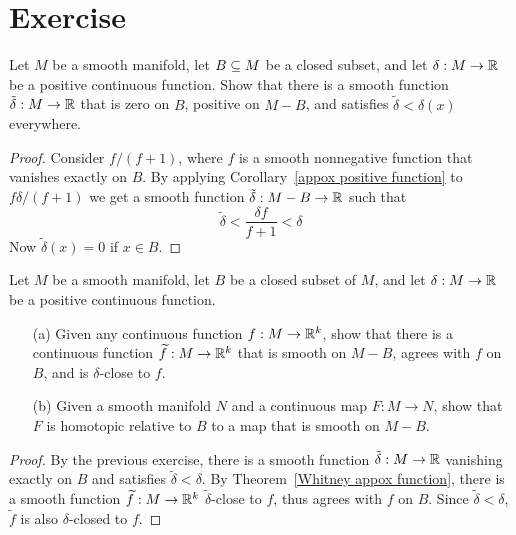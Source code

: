 \section{Exercise}
\begin{exercise}
Let $M$ be a smooth manifold, let $B\subseteq M$ be a closed subset, and let $\delta:M\to\mathbb{R}$ be a positive continuous function. Show that there is a smooth function $\tilde{\delta}:M\to\mathbb{R}$ that is zero on $B$, positive on $M-B$, and satisfies $\tilde{\delta}<\delta(x)$ everywhere.
\end{exercise}
\begin{proof}
Consider $f/(f+1)$, where $f$ is a smooth nonnegative function that vanishes exactly on $B$. By applying Corollary~\ref{appox positive function} to $f\delta/(f+1)$ we get a smooth function $\tilde{\delta}:M-B\to\mathbb{R}$ such that 
\[\tilde{\delta}<\frac{\delta f}{f+1}<\delta\]
Now $\tilde{\delta}(x)=0$ if $x\in B$.
\end{proof}
\begin{exercise}
Let $M$ be a smooth manifold, let $B$ be a closed subset of $M$, and let $\delta:M\to\mathbb{R}$ be a positive continuous function.
\begin{itemize}
\item[(a)]Given any continuous function $f:M\to\mathbb{R}^k$, show that there is a continuous function $\widetilde{f}:M\to\mathbb{R}^k$ that is smooth on $M-B$, agrees with $f$ on $B$, and is $\delta$-close to $f$.
\item[(b)]Given a smooth manifold $N$ and a continuous map $F:M\to N$, show that $F$ is homotopic relative to $B$ to a map that is smooth on $M-B$.
\end{itemize}
\end{exercise}
\begin{proof}
By the previous exercise, there is a smooth function $\tilde{\delta}:M\to\mathbb{R}$ vanishing exactly on $B$ and satisfies $\tilde{\delta}<\delta$. By Theorem~\ref{Whitney appox function}, there is a smooth function $\widetilde{f}:M\to\mathbb{R}^k$ $\tilde{\delta}$-close to $f$, thus agrees with $f$ on $B$. Since $\tilde{\delta}<\delta$, $\widetilde{f}$ is also $\delta$-closed to $f$.
\end{proof}
